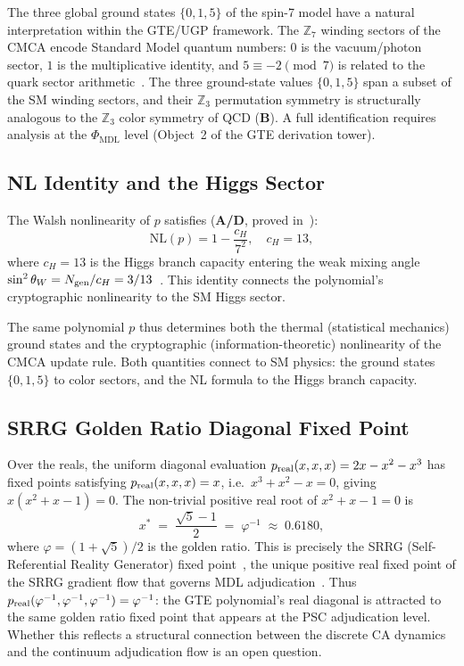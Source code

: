 \documentclass[11pt]{article}
\theoremstyle{remark}
\newcommand{\PHIMDL}{\ensuremath{\Phi_{\mathrm{MDL}}}}
\newcommand{\CatAD}{\textbf{A/D}}
\newcommand{\CatB}{\textbf{B}}
\begin{document}
The three global ground states $\{0, 1, 5\}$ of the spin-7 model have a natural
interpretation within the GTE/UGP framework. The $\mathbb{Z}_7$ winding sectors
of the CMCA encode Standard Model quantum numbers: $0$ is the vacuum/photon sector,
$1$ is the multiplicative identity, and $5 \equiv -2 \pmod 7$ is related to the
quark sector arithmetic~\cite{SpivackCMCA, SpivackGTEPolynomialUFT}. The three
ground-state values $\{0, 1, 5\}$ span a subset of the SM winding sectors, and
their $\mathbb{Z}_3$ permutation symmetry is structurally analogous to the $\mathbb{Z}_3$
color symmetry of QCD (\CatB{}). A full identification requires analysis at the
$\PHIMDL{}$ level (Object~2 of the GTE derivation tower).

\subsection{NL Identity and the Higgs Sector}

The Walsh nonlinearity of $p$ satisfies (\CatAD{}, proved in~\cite{SpivackGTEPolynomialWolfram}):
\[
  \mathrm{NL}(p) = 1 - \frac{c_H}{7^2}, \quad c_H = 13,
\]
where $c_H = 13$ is the Higgs branch capacity entering the weak mixing angle
$\sin^2\theta_W = N_{\rm gen}/c_H = 3/13$~\cite{SpivackCMCA, SpivackCompleteness}.
This identity connects the polynomial's cryptographic nonlinearity to the
SM Higgs sector.

The same polynomial $p$ thus determines both the thermal (statistical mechanics)
ground states and the cryptographic (information-theoretic) nonlinearity of the
CMCA update rule. Both quantities connect to SM physics: the ground states
$\{0,1,5\}$ to color sectors, and the NL formula to the Higgs branch capacity.

\subsection{SRRG Golden Ratio Diagonal Fixed Point}

Over the reals, the uniform diagonal evaluation $p_{\rm real}(x,x,x) = 2x - x^2 - x^3$ has
fixed points satisfying $p_{\rm real}(x,x,x) = x$, i.e.\ $x^3 + x^2 - x = 0$, giving
$x(x^2 + x - 1) = 0$. The non-trivial positive real root of $x^2 + x - 1 = 0$ is
\[
  x^* \;=\; \frac{\sqrt{5}-1}{2} \;=\; \varphi^{-1} \;\approx\; 0.6180,
\]
where $\varphi = (1+\sqrt{5})/2$ is the golden ratio. This is precisely the SRRG
(Self-Referential Reality Generator) fixed point~\cite{SpivackSRRG}, the unique
positive real fixed point of the SRRG gradient flow that governs MDL
adjudication~\cite{SpivackCompleteness}. Thus $p_{\rm real}(\varphi^{-1}, \varphi^{-1},
\varphi^{-1}) = \varphi^{-1}$: the GTE polynomial's real diagonal is attracted to the
same golden ratio fixed point that appears at the PSC adjudication level. Whether this
reflects a structural connection between the discrete CA dynamics and the continuum
adjudication flow is an open question.
\end{document}
